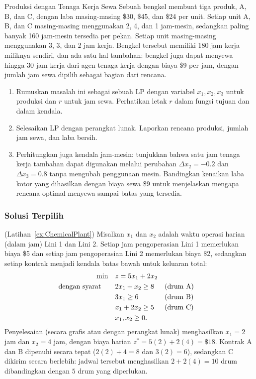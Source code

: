 \begin{ex}{Produksi dengan Tenaga Kerja Sewa}{}
\label{ex:rented-labor}
 Sebuah bengkel membuat tiga produk, A, B, dan C, dengan laba masing-masing \$30, \$45, dan \$24 per unit. Setiap unit A, B, dan C masing-masing menggunakan 2, 4, dan 1 jam-mesin, sedangkan paling banyak 160 jam-mesin tersedia per pekan. Setiap unit masing-masing menggunakan 3, 3, dan 2 jam kerja. Bengkel tersebut memiliki 180 jam kerja miliknya sendiri, dan ada satu hal tambahan: bengkel juga dapat menyewa hingga 30 jam kerja dari agen tenaga kerja dengan biaya \$9 per jam, dengan jumlah jam sewa dipilih sebagai bagian dari rencana.
\begin{enumerate}
\item Rumuskan masalah ini sebagai sebuah LP dengan variabel $x_1, x_2, x_3$ untuk produksi dan $r$ untuk jam sewa. Perhatikan letak $r$ dalam fungsi tujuan dan dalam kendala.
\item Selesaikan LP dengan perangkat lunak. Laporkan rencana produksi, jumlah jam sewa, dan laba bersih.
\item Perhitungkan juga kendala jam-mesin: tunjukkan bahwa satu jam tenaga kerja tambahan dapat digunakan melalui perubahan $\Delta x_2=-0.2$ dan $\Delta x_3=0.8$ tanpa mengubah penggunaan mesin. Bandingkan kenaikan laba kotor yang dihasilkan dengan biaya sewa \$9 untuk menjelaskan mengapa rencana optimal menyewa sampai batas yang tersedia.
\end{enumerate}
\end{ex}

\subsubsection*{Solusi Terpilih}

\begin{solution}(Latihan~\ref{ex:ChemicalPlant})
Misalkan $x_1$ dan $x_2$ adalah waktu operasi harian (dalam jam) Lini 1 dan Lini 2. Setiap jam pengoperasian Lini 1 memerlukan biaya \$5 dan setiap jam pengoperasian Lini 2 memerlukan biaya \$2, sedangkan setiap kontrak menjadi kendala batas bawah untuk keluaran total:
\begin{align*}
\min \quad & z = 5x_1 + 2x_2\\
\mbox{dengan syarat}\quad \quad & 2x_1 + x_2 \geq 8 && \mbox{(drum A)}\\
& 3x_1 \geq 6 && \mbox{(drum B)}\\
& x_1 + 2x_2 \geq 5 && \mbox{(drum C)}\\
& x_1, x_2 \geq 0.
\end{align*}
Penyelesaian (secara grafis atau dengan perangkat lunak) menghasilkan $x_1 = 2$ jam dan $x_2 = 4$ jam, dengan biaya harian $z^* = 5(2) + 2(4) = \$18$. Kontrak A dan B dipenuhi secara tepat ($2(2)+4 = 8$ dan $3(2) = 6$), sedangkan C dikirim secara berlebih: jadwal tersebut menghasilkan $2 + 2(4) = 10$ drum dibandingkan dengan $5$ drum yang diperlukan.
\end{solution}

